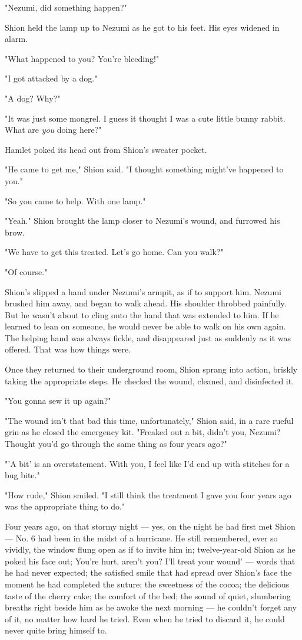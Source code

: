 "Nezumi, did something happen?"

Shion held the lamp up to Nezumi as he got to his feet. His eyes widened
in alarm.

"What happened to you? You're bleeding!"

"I got attacked by a dog."

"A dog? Why?"

"It was just some mongrel. I guess it thought I was a cute little bunny
rabbit. What are \emph{you} doing here?"

Hamlet poked its head out from Shion's sweater pocket.

"He came to get me," Shion said. "I thought something might've happened
to you."

"So you came to help. With one lamp."

"Yeah." Shion brought the lamp closer to Nezumi's wound, and furrowed
his brow.

"We have to get this treated. Let's go home. Can you walk?"

"Of course."

Shion's slipped a hand under Nezumi's armpit, as if to support him.
Nezumi brushed him away, and began to walk ahead. His shoulder throbbed
painfully. But he wasn't about to cling onto the hand that was extended
to him. If he learned to lean on someone, he would never be able to walk
on his own again. The helping hand was always fickle, and disappeared
just as suddenly as it was offered. That was how things were.

Once they returned to their underground room, Shion sprang into action,
briskly taking the appropriate steps. He checked the wound, cleaned, and
disinfected it.

"You gonna sew it up again?"

"The wound isn't that bad this time, unfortunately," Shion said, in a
rare rueful grin as he closed the emergency kit. "Freaked out a bit,
didn't you, Nezumi? Thought you'd go through the same thing as four
years ago?"

"'A bit' is an overstatement. With you, I feel like I'd end up with
stitches for a bug bite."

"How rude," Shion smiled. "I still think the treatment I gave you four
years ago was the appropriate thing to do."

Four years ago, on that stormy night --- yes, on the night he had first
met Shion --- No. 6 had been in the midst of a hurricane. He still
remembered, ever so vividly, the window flung open as if to invite him
in; twelve-year-old Shion as he poked his face out; You're hurt, aren't
you? I'll treat your wound' --- words that he had never expected; the
satisfied smile that had spread over Shion's face the moment he had
completed the suture; the sweetness of the cocoa; the delicious taste of
the cherry cake; the comfort of the bed; the sound of quiet, slumbering
breaths right beside him as he awoke the next morning --- he couldn't
forget any of it, no matter how hard he tried. Even when he tried to
discard it, he could never quite bring himself to.

